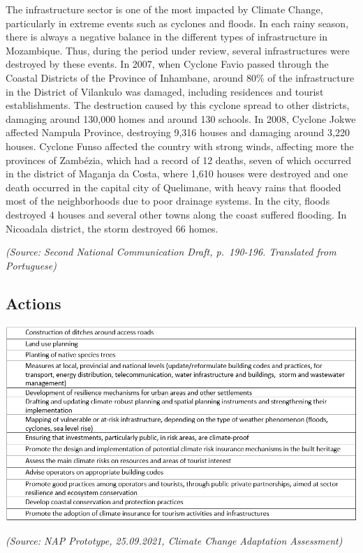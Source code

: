 \documentclass[
]{book}
\begin{document}
The infrastructure sector is one of the most impacted by Climate Change, particularly in extreme events such as cyclones and floods. In each rainy season, there is always a negative balance in the different types of infrastructure in Mozambique. Thus, during the period under review, several infrastructures were destroyed by these events. In 2007, when Cyclone Favio passed through the Coastal Districts of the Province of Inhambane, around 80\% of the infrastructure in the District of Vilankulo was damaged, including residences and tourist establishments. The destruction caused by this cyclone spread to other districts, damaging around 130,000 homes and around 130 schools. In 2008, Cyclone Jokwe affected Nampula Province, destroying 9,316 houses and damaging around 3,220 houses. Cyclone Funso affected the country with strong winds, affecting more the provinces of Zambézia, which had a record of 12 deaths, seven of which occurred in the district of Maganja da Costa, where 1,610 houses were destroyed and one death occurred in the capital city of Quelimane, with heavy rains that flooded most of the neighborhoods due to poor drainage systems. In the city, floods destroyed 4 houses and several other towns along the coast suffered flooding. In Nicoadala district, the storm destroyed 66 homes.

\emph{(Source: Second National Communication Draft, p.~190-196. Translated from Portuguese)}

\hypertarget{actions-6}{%
\subsection{Actions}\label{actions-6}}

\includegraphics{Figure43.png}

\emph{(Source: NAP Prototype, 25.09.2021, Climate Change Adaptation Assessment)}
\end{document}
